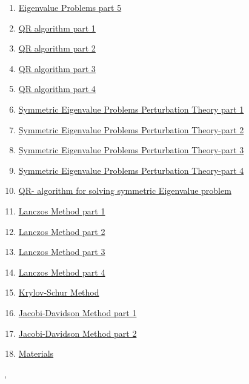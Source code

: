 \documentclass[11pt]{article}
\renewcommand{\today}{\shortmonthname[\the\month] \the \day,  \the\year}
\begin{document}
\begin{enumerate}
	\item \href{https://mp.weixin.qq.com/s/5gBtQn4hTsvcqkIL1dH0oQ}{Eigenvalue Problems part 5}	%
	\item \href{https://mp.weixin.qq.com/s/aGYoYIxYKjLFB8yVQgCNrA}{QR algorithm part 1}	%
	\item \href{https://mp.weixin.qq.com/s/q-utcLS9N6MxEhUv1b_v3g}{QR algorithm part 2}	%
	\item \href{https://mp.weixin.qq.com/s/x-wZo37HkdTBaHg5P-N6Lg}{QR algorithm part 3}	%
	\item \href{https://mp.weixin.qq.com/s/EWmVjDG37YQCTaB81O6D9g}{QR algorithm part 4}	%
	\item \href{https://mp.weixin.qq.com/s/zKE1uWmkHJoiI3Q5HDLDZQ}{Symmetric Eigenvalue Problems Perturbation Theory part 1}	%
	\item \href{https://mp.weixin.qq.com/s/JToE1VFIlKY9K0tV1Rb70w}{Symmetric Eigenvalue Problems Perturbation Theory-part 2}	%
	\item \href{https://mp.weixin.qq.com/s/fu09Fu_Wrp-BqUNXjtWCtA}{Symmetric Eigenvalue Problems Perturbation Theory-part 3}	%
	\item \href{https://mp.weixin.qq.com/s/NpLdimzbU-9-4KgiCaDTLQ}{Symmetric Eigenvalue Problems Perturbation Theory-part 4}	%
	\item \href{https://mp.weixin.qq.com/s/ZgLVdrBiaVm4pwp8aOCT6A}{QR- algorithm for solving symmetric Eigenvalue problem}	%
	\item \href{https://mp.weixin.qq.com/s/xGYO0UOebP7lTUAjRGoaew}{Lanczos Method part 1}	%
	\item \href{https://mp.weixin.qq.com/s/0SAHglaKWPQ7IGcTDB88uQ}{Lanczos Method part 2}	%
	\item \href{https://mp.weixin.qq.com/s/R0rCtoQWDttU8VBlaRlkDw}{Lanczos Method part 3}	%
	\item \href{https://mp.weixin.qq.com/s/CPA6fEbnS-IoU4KaD3TvGQ L}{Lanczos Method part 4}	%
	\item \href{https://mp.weixin.qq.com/s/CMclrJ1ucNZV2qU2ZBZQWQL}{Krylov-Schur Method}	%
	\item \href{https://mp.weixin.qq.com/s/4UEWYhiZNuO0XyWobXWLjQ}{Jacobi-Davidson Method part 1}	%
	\item \href{https://mp.weixin.qq.com/s/D7T6hhSekBPTQhbRPl29PQ}{Jacobi-Davidson Method part 2}	%
	\item \href{url}{Materials}
\end{enumerate}


%
\begin{flushright}
	\tiny \today 
\end{flushright}
\end{document}
